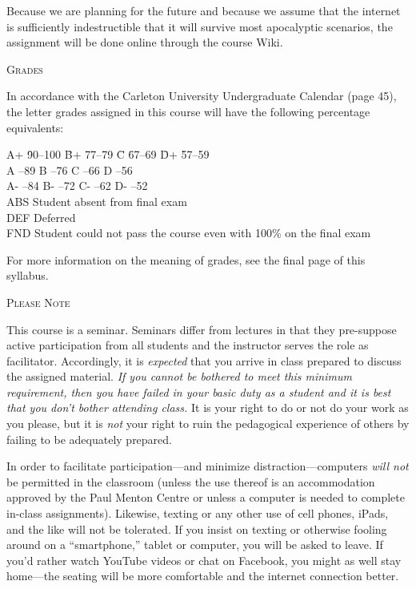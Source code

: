 \documentclass[12pt]{article}
\begin{document}
Because we are planning for the future and because we assume that the internet is sufficiently indestructible that it will survive most apocalyptic scenarios, the assignment will be done online through the course Wiki.

{\large \textsc{Grades}}

In accordance with the Carleton University Undergraduate Calendar (page 45), the letter grades assigned in this course will have the following percentage equivalents:

\begin{tabbing}
A+ \hspace{.125in} \= 90--100 \hspace{.25in} \= B+ \hspace{.125in} \= 77--79 \hspace{.25in} \= C \hspace{.125in} \= 67--69 \hspace{.25in} \= D+ \hspace{.125in} \= 57--59 \\
A --89 \> B --76 \> C --66 \> D --56 \\
A- --84 \> B- --72 \> C- --62 \> D- --52 \\
ABS \> Student absent from final exam \\
DEF \> Deferred \\
FND \> Student could not pass the course even with 100\% on the final exam
\end{tabbing}

For more information on the meaning of grades, see the final page of this syllabus.

\newpage

{\large \textsc{Please Note}}

This course is a seminar. Seminars differ from lectures in that they pre-suppose active participation from all students and the instructor serves the role as facilitator. Accordingly, it is \textit{expected} that you arrive in class prepared to discuss the assigned material. \textit{If you cannot be bothered to meet this minimum requirement, then you have failed in your basic duty as a student and it is best that you don't bother attending class.} It is your right to do or not do your work as you please, but it is \textit{not} your right to ruin the pedagogical experience of others by failing to be adequately prepared.

In order to facilitate participation---and minimize distraction---computers \emph{will not} be permitted in the classroom (unless the use thereof is an accommodation approved by the Paul Menton Centre or unless a computer is needed to complete in-class assignments). Likewise, texting or any other use of cell phones, iPads, and the like will not be tolerated. If you insist on texting or otherwise fooling around on a ``smartphone,'' tablet or computer, you will be asked to leave. If you'd rather watch YouTube videos or chat on Facebook, you might as well stay home---the seating will be more comfortable and the internet connection better.
\end{document}
